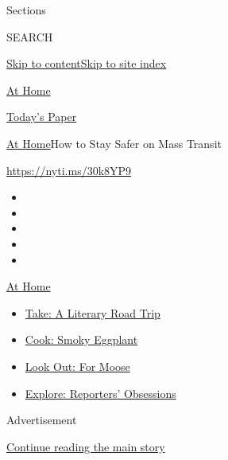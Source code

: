 Sections

SEARCH

\protect\hyperlink{site-content}{Skip to
content}\protect\hyperlink{site-index}{Skip to site index}

\href{https://www.nytimes.com/spotlight/at-home}{At Home}

\href{https://myaccount.nytimes.com/auth/login?response_type=cookie\&client_id=vi}{}

\href{https://www.nytimes.com/section/todayspaper}{Today's Paper}

\href{/spotlight/at-home}{At Home}\textbar{}How to Stay Safer on Mass
Transit

\url{https://nyti.ms/30k8YP9}

\begin{itemize}
\item
\item
\item
\item
\item
\end{itemize}

\href{https://www.nytimes.com/spotlight/at-home?action=click\&pgtype=Article\&state=default\&region=TOP_BANNER\&context=at_home_menu}{At
Home}

\begin{itemize}
\tightlist
\item
  \href{https://www.nytimes.com/2020/07/28/books/time-for-a-literary-road-trip.html?action=click\&pgtype=Article\&state=default\&region=TOP_BANNER\&context=at_home_menu}{Take:
  A Literary Road Trip}
\item
  \href{https://www.nytimes.com/2020/07/29/magazine/bored-with-your-home-cooking-some-smoky-eggplant-will-fix-that.html?action=click\&pgtype=Article\&state=default\&region=TOP_BANNER\&context=at_home_menu}{Cook:
  Smoky Eggplant}
\item
  \href{https://www.nytimes.com/2020/07/27/travel/moose-michigan-isle-royale.html?action=click\&pgtype=Article\&state=default\&region=TOP_BANNER\&context=at_home_menu}{Look
  Out: For Moose}
\item
  \href{https://www.nytimes.com/interactive/2020/at-home/even-more-reporters-editors-diaries-lists-recommendations.html?action=click\&pgtype=Article\&state=default\&region=TOP_BANNER\&context=at_home_menu}{Explore:
  Reporters' Obsessions}
\end{itemize}

Advertisement

\protect\hyperlink{after-top}{Continue reading the main story}

